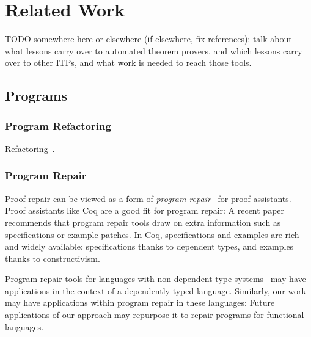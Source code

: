 \chapter{Related Work}
\label{sec:related}


TODO somewhere here or elsewhere (if elsewhere, fix references): talk about what lessons carry over to automated theorem provers,
and which lessons carry over to other ITPs, and what work is needed to reach those tools.

\section{Programs}

\subsection*{Program Refactoring} 

Refactoring~\cite{Mens:2004:SSR:972215.972286}.

\subsection*{Program Repair} 


Proof repair can be viewed as a form of \textit{program repair}~\cite{Monperrus:2018:ASR:3177787.3105906, Gazzola:2018:ASR:3180155.3182526}
for proof assistants.
Proof assistants like Coq are a good fit for program repair: A recent paper~\cite{Qi:2015:APP:2771783.2771791} 
recommends that program repair tools draw on extra information
such as specifications or example patches. In Coq, specifications and examples 
are rich and widely available: specifications thanks to dependent types,
and examples thanks to constructivism.


Program repair tools for 
languages with non-dependent type 
systems~\cite{Pei:2014:APR:2731750.2731779, Long:2016:APG:2837614.2837617, Le:2017:SSS:3106237.3106309, Mechtaev:2016:ASM:2884781.2884807, Monperrus2015} 
may have applications in the context of a dependently typed language.
Similarly, our work may have applications within program repair in these languages:
Future applications of our approach may repurpose it to repair programs for functional languages.

